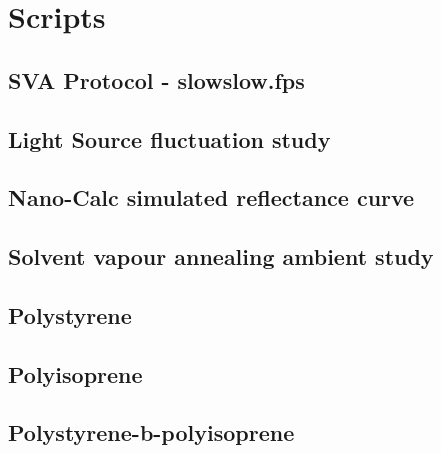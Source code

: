 \documentclass[MasterThesisMain.tex]{subfiles}
\begin{document}



\chapter{Scripts}

\section{SVA Protocol - slowslow.fps}\label{app:slowslow}


\section{Light Source fluctuation study}\label{app:Lightstudy}


\section{Nano-Calc simulated reflectance curve}\label{app:simcurves}




\section{Solvent vapour annealing ambient study}\label{app:svaambient}



\section{Polystyrene}



\section{Polyisoprene}



\section{Polystyrene-b-polyisoprene}


\end{document}
